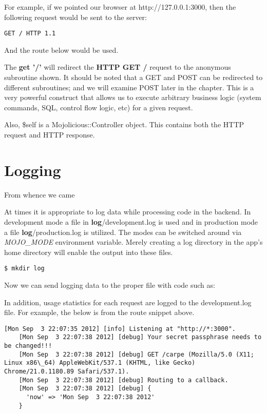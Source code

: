 \documentclass[14pt]{extreport}
\begin{document}
For example, if we pointed our browser at http://127.0.0.1:3000, then the
following request would be sent to the server:

\begin{lstlisting}[style=BlockStyle]
    GET / HTTP 1.1
\end{lstlisting}

And the route below would be used.



The \textbf{get '/'} will redirect the \textbf{HTTP GET /} request to the
anonymous subroutine shown. It should be noted that a GET and POST can be
redirected to different subroutines; and we will examine POST later in the
chapter.  This is a very powerful construct that allows us to execute arbitrary
business logic (system commands, SQL, control flow logic, etc) for a given
request.

Also, \$self is a Mojolicious::Controller object.  This contains both the HTTP
request and HTTP response.

\section{Logging}

{\Large From whence we came}

At times it is appropriate to log data while processing code in the backend.
In development mode a file in \textbf{log}/development.log is used and in
production mode a file \textbf{log}/production.log is utilized. The modes can
be switched around via \textit{MOJO\_MODE} environment variable. Merely
creating a log directory in the app's home directory will enable the output
into these files.

\begin{lstlisting}[style=BashInputStyle]
$ mkdir log
\end{lstlisting}

Now we can send logging data to the proper file with code such as:



In addition, usage statistics for each request are logged to the
development.log file.  For example, the below is from the route snippet above.

\begin{lstlisting}[style=BashOutputStyle]
    [Mon Sep  3 22:07:35 2012] [info] Listening at "http://*:3000".
    [Mon Sep  3 22:07:38 2012] [debug] Your secret passphrase needs to be changed!!!
    [Mon Sep  3 22:07:38 2012] [debug] GET /carpe (Mozilla/5.0 (X11; Linux x86\_64) AppleWebKit/537.1 (KHTML, like Gecko) Chrome/21.0.1180.89 Safari/537.1).
    [Mon Sep  3 22:07:38 2012] [debug] Routing to a callback.
    [Mon Sep  3 22:07:38 2012] [debug] {
      'now' => 'Mon Sep  3 22:07:38 2012'
    }
\end{lstlisting}
\end{document}
